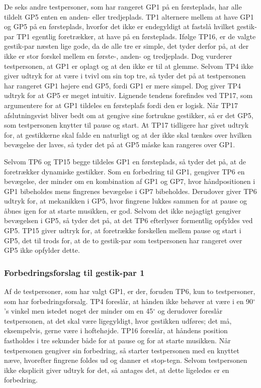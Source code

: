 De seks andre testpersoner, som har rangeret GP1 på en førsteplads, har alle tildelt GP5 enten en anden- eller tredjeplads. TP1 alternere mellem at have GP1 og GP5 på en førsteplads, hvorfor det ikke er endegyldigt at fastslå hvilket gestik-par TP1 egentlig foretrækker, at have på en førsteplads. Ifølge TP16, er de valgte gestik-par næsten lige gode, da de alle tre er simple, det tyder derfor på, at der ikke er stor forskel mellem en første-, anden- og tredjeplads. Dog vurderer testpersonen, at GP1 er oplagt og at den ikke er til at glemme. Selvom TP4 ikke giver udtryk for at være i tvivl om sin top tre, så tyder det på at testpersonen har rangeret GP1 højere end GP5, fordi GP1 er mere simpel. Dog giver TP4 udtryk for at GP5 er meget intuitiv. Lignende tendens forefindes ved TP17, som argumentere for at GP1 tildeles en førsteplafs fordi den er logisk. Når TP17 afslutningsvist bliver bedt om at gengive sine fortrukne gestikker, så er det GP5, som testpersonen knytter til pause og start. At TP17 tidligere har givet udtryk for, at gestikkerne skal falde en naturligt og at der ikke skal tænkes over hvilken bevægelse der laves, så tyder det på at GP5 måske kan rangeres over GP1.

Selvom TP6 og TP15 begge tildeles GP1 en førsteplads, så tyder det på, at de foretrækker dynamiske gestikker. Som en forbedring til GP1, gengiver TP6 en bevægelse, der minder om en kombination af GP1 og GP7, hvor håndpositionen i GP1 bibeholdes mens fingrenes bevægelse i GP7 bibeholdes. Derudover giver TP6 udtryk for, at mekanikken i GP5, hvor fingrene lukkes sammen for at pause og åbnes igen for at starte musikken, er god. Selvom det ikke nøjagtigt gengiver bevægelsen i GP5, så tyder det på, at det TP6 efterlyser formentlig opfyldes ved GP5. TP15 giver udtryk for, at foretrække forskellen mellem pause og start i GP5, det til trods for, at de to gestik-par som testpersonen har rangeret over GP5 ikke opfylder dette.  
%
\subsubsection{Forbedringsforslag til gestik-par 1}
\label{TestresultaterValgAfGestikkerForbedringGP1}
%
Af de testpersoner, som har valgt GP1, er der, foruden TP6, kun to testpersoner, som har forbedringsforsalg. TP4 foreslår, at hånden ikke behøver at være i en 90$^{\circ}$'s vinkel men istedet noget der minder om en 45$^{\circ}$ og derudover foreslår testpersonen, at det skal være ligegyldigt, hvor gestikken udføres; det må, eksempelvis, gerne være i hoftehøjde. TP16 foreslår, at håndens position fastholdes i tre sekunder både for at pause og for at starte musikken. Når testpersonen gengiver sin forbedring, så starter testpersonen med en knyttet næve, hvorefter fingrene foldes ud og danner et stop-tegn. Selvom testpersonen ikke eksplicit giver udtryk for det, så antages det, at dette ligeledes er en forbedring.
%
